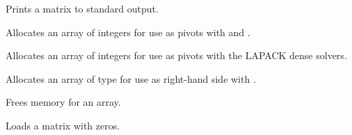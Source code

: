 \documentclass[letterpaper,10pt,english]{sphinxmanual}
\begin{document}

\begin{fulllineitems}
\label{linear_solvers/DLS:PrintMat}
Prints a {\hyperref[linear_solvers/DLS:DlsMat]{}} matrix to standard output.

\end{fulllineitems}


\begin{fulllineitems}
\label{linear_solvers/DLS:NewLintArray}
Allocates an array of  integers for use as pivots with
{\hyperref[linear_solvers/DLS:DenseGETRF]{}} and .

\end{fulllineitems}


\begin{fulllineitems}
\label{linear_solvers/DLS:NewIntArray}
Allocates an array of  integers for use as pivots with the
LAPACK dense solvers.

\end{fulllineitems}


\begin{fulllineitems}
\label{linear_solvers/DLS:NewRealArray}
Allocates an array of type  for use as right-hand side
with .

\end{fulllineitems}


\begin{fulllineitems}
\label{linear_solvers/DLS:DestroyArray}
Frees memory for an array.

\end{fulllineitems}


\begin{fulllineitems}
\label{linear_solvers/DLS:SetToZero}
Loads a matrix with zeros.

\end{fulllineitems}
\end{document}
